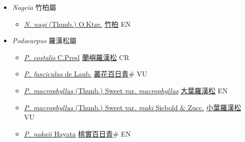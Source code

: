
  \begin{itemize}
 \item[] \textit{Nageia} 竹柏屬
                    
  \begin{itemize}
        \item[] \href{http://www.theplantlist.org/tpl1.1/search?q=Nageia+nagi}{\textit{N. nagi} (Thunb.) O.Ktze.}   \href{\detokenize{http://taibnet.sinica.edu.tw/chi/taibnet_species_list.php?T2=竹柏&T2_new_value=true&fr=y}}{竹柏} EN
  \end{itemize}
 \item[] \textit{Podocarpus} 羅漢松屬
                    
  \begin{itemize}
        \item[] \href{http://www.theplantlist.org/tpl1.1/search?q=Podocarpus+costalis}{\textit{P. costalis} C.Presl}   \href{\detokenize{http://taibnet.sinica.edu.tw/chi/taibnet_species_list.php?T2=蘭嶼羅漢松&T2_new_value=true&fr=y}}{蘭嶼羅漢松} CR
        \item[] \href{http://www.theplantlist.org/tpl1.1/search?q=Podocarpus+fasciculus}{\textit{P. fasciculus} de Laub.}   \href{\detokenize{http://taibnet.sinica.edu.tw/chi/taibnet_species_list.php?T2=叢花百日青&T2_new_value=true&fr=y}}{叢花百日青}\# VU
        \item[] \href{http://www.theplantlist.org/tpl1.1/search?q=Podocarpus+macrophyllus+var.+macrophyllus}{\textit{P. macrophyllus} (Thunb.) Sweet var. \textit{macrophyllus}}   \href{\detokenize{http://taibnet.sinica.edu.tw/chi/taibnet_species_list.php?T2=大葉羅漢松&T2_new_value=true&fr=y}}{大葉羅漢松} EN
        \item[] \href{http://www.theplantlist.org/tpl1.1/search?q=Podocarpus+macrophyllus+var.+maki}{\textit{P. macrophyllus} (Thunb.) Sweet var. \textit{maki} Siebold \& Zucc.}   \href{\detokenize{http://taibnet.sinica.edu.tw/chi/taibnet_species_list.php?T2=小葉羅漢松&T2_new_value=true&fr=y}}{小葉羅漢松} VU
        \item[] \href{http://www.theplantlist.org/tpl1.1/search?q=Podocarpus+nakaii}{\textit{P. nakaii} Hayata}   \href{\detokenize{http://taibnet.sinica.edu.tw/chi/taibnet_species_list.php?T2=桃實百日青&T2_new_value=true&fr=y}}{桃實百日青}\# EN
  \end{itemize}
  \end{itemize}
